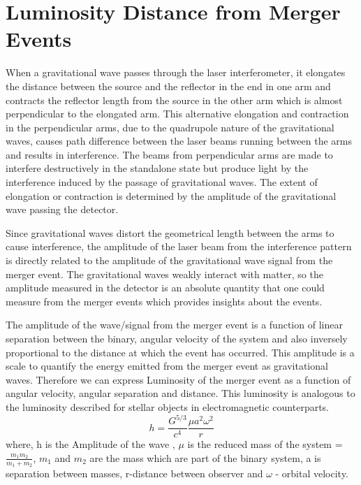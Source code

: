 \section{Luminosity Distance from Merger Events}
When a gravitational wave passes through the laser interferometer, it elongates the distance between the source and the reflector in the end in one arm and contracts the reflector length from the source in the other arm which is almost perpendicular to the elongated arm. This alternative elongation and contraction in the perpendicular arms, due to the quadrupole nature of the gravitational waves, causes path difference between the laser beams running between the arms and results in interference. The beams from perpendicular arms are made to interfere destructively in the standalone state but produce light by the interference induced by the passage of gravitational waves. The extent of elongation or contraction is determined by the amplitude of the gravitational wave passing the detector.

Since gravitational waves distort the geometrical length between the arms to cause interference, the amplitude of the laser beam from the interference pattern is directly related to the amplitude of the gravitational wave signal from the merger event. The gravitational waves weakly interact with matter, so the amplitude measured in the detector is an absolute quantity that one could measure from the merger events which provides insights about the events.

The amplitude of the wave/signal from the merger event is a function of linear separation between the binary, angular velocity of the system and also inversely proportional to the distance at which the event has occurred. This amplitude is a scale to quantify the energy emitted from the merger event as gravitational waves. Therefore we can express Luminosity of the merger event as a function of angular velocity, angular separation and distance. This luminosity is analogous to the luminosity described for stellar objects in electromagnetic counterparts.
\begin{equation}\label{AmplitudeGW}
    h = {\frac{G^{5/3}}{c^{4}}}\frac{{\mu}{a^{2}}{\omega^{2}}}{r}
\end{equation}
where, h is the Amplitude of the wave , $\mu$ is the reduced mass of the system = $\frac{{m_1}{m_2}}{m_1+m_2}$, $m_1$ and $m_2$ are the mass which are part of the binary system, a is separation between masses, r-distance between observer and $\omega$ - orbital velocity.

